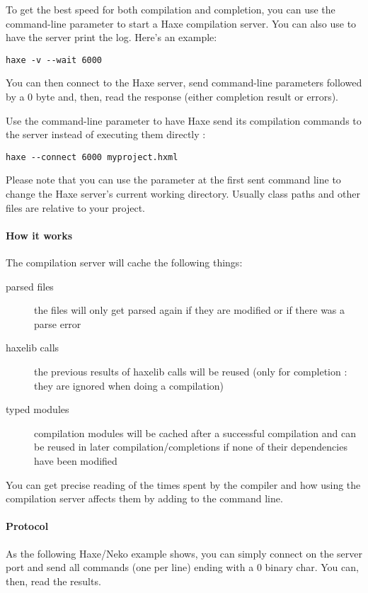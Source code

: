 To get the best speed for both compilation and completion, you can use the  command-line parameter to start a Haxe compilation server. You can also use  to have the server print the log. Here's an example:

\begin{lstlisting}
haxe -v --wait 6000
\end{lstlisting}

You can then connect to the Haxe server, send command-line parameters followed by a 0 byte and, then, read the response (either completion result or errors).

Use the  command-line parameter to have Haxe send its compilation commands to the server instead of executing them directly :

\begin{lstlisting}
haxe --connect 6000 myproject.hxml
\end{lstlisting}

Please note that you can use the parameter  at the first sent command line to change the Haxe server's current working directory. Usually class paths and other files are relative to your project.

\paragraph{How it works}
The compilation server will cache the following things:

\begin{description}
	\item[parsed files] the files will only get parsed again if they are modified or if there was a parse error
	\item[haxelib calls] the previous results of haxelib calls will be reused (only for completion : they are ignored when doing a compilation)
	\item[typed modules] compilation modules will be cached after a successful compilation and can be reused in later compilation/completions if none of their dependencies have been modified
\end{description}

You can get precise reading of the times spent by the compiler and how using the compilation server affects them by adding  to the command line.

\paragraph{Protocol}
As the following Haxe/Neko example shows, you can simply connect on the server port and send all commands (one per line) ending with a 0 binary char. You can, then, read the results.

